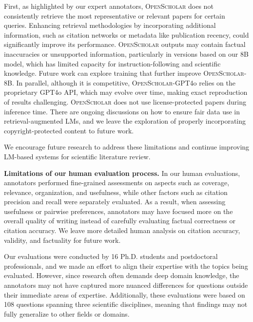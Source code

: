 \documentclass{article} %
\newcommand{\model}{\textsc{OpenScholar}\xspace}
\renewcommand{\paragraph}[1]{\noindent \textbf{#1}}
\begin{document}
First, as highlighted by our expert annotators, \model does not consistently retrieve the most representative or relevant papers for certain queries. Enhancing retrieval methodologies by incorporating additional information, such as citation networks or metadata like publication recency, could significantly improve its performance. 
\model outputs may contain factual inaccuracies or unsupported information, particularly in versions based on our 8B model, which has limited capacity for instruction-following and scientific knowledge.  
Future work can explore training that further improve \model-8B. 
In parallel, although it is competitive, \model-GPT4o relies on the proprietary GPT4o API, which may evolve over time, making exact reproduction of results challenging. 
\model does not use license-protected papers during inference time. 
There are ongoing discussions on how to ensure fair data use in retrieval-augmented LMs, and we leave the exploration of properly incorporating copyright-protected content to future work. 

We encourage future research to address these limitations and continue improving LM-based systems for scientific literature review. 



\paragraph{Limitations of our human evaluation process.}
In our human evaluations, annotators performed fine-grained assessments on aspects such as coverage, relevance, organization, and usefulness, while other factors such as citation precision and recall were separately evaluated. As a result, when assessing usefulness or pairwise preferences, annotators may have focused more on the overall quality of writing instead of carefully evaluating factual correctness or citation accuracy. We leave more detailed human analysis on citation accuracy, validity, and factuality for future work.

Our evaluations were conducted by 16 Ph.D. students and postdoctoral professionals, and we made an effort to align their expertise with the topics being evaluated. However, since research often demands deep domain knowledge, the annotators may not have captured more nuanced differences for questions outside their immediate areas of expertise. 
Additionally, these evaluations were based on 108 questions spanning three scientific disciplines, meaning that findings may not fully generalize to other fields or domains. 
 
\end{document}
